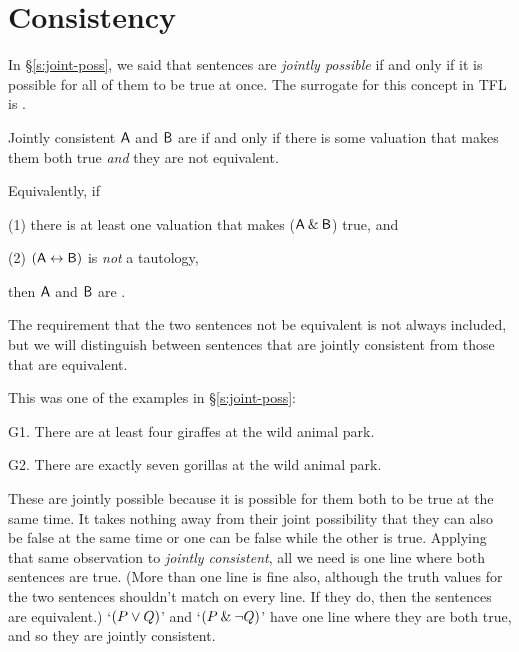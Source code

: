 \section{Consistency}\label{consistency--tt}
In \S\ref{s:joint-poss}, we said that sentences are \textit{jointly possible} if and only if it is possible for all of them to be true at once. The surrogate for this concept in TFL is . 

\begin{factboxy}{Jointly consistent}
$\mathsf{A}$ and $\mathsf{B}$ are  if and only if there is some valuation that makes them both true \textit{and} they are not equivalent.
\medskip
		
Equivalently, if
\begin{earg}
\vspace{-2mm}
	\item[(1)] there is at least one valuation that makes ($\mathsf{A}\mathbin{\&}\mathsf{B}$) true, and
	\item[(2)] $(\mathsf{A} \leftrightarrow \mathsf{B})$ is \textit{not} a tautology,
\vspace{-2mm}
\end{earg}		
then $\mathsf{A}$ and $\mathsf{B}$ are .
\end{factboxy}

\noindent The requirement that the two sentences not be equivalent is not always included, but we will distinguish between sentences that are jointly consistent from those that are equivalent. 

This was one of the examples in \S\ref{s:joint-poss}:
\begin{ebullet}	
		\item[G1.] There are at least four giraffes at the wild animal park.
		\item[G2.] There are exactly seven gorillas at the wild animal park.
	\end{ebullet}
These are jointly possible because it is possible for them both to be true at the same time. It takes nothing away from their joint possibility that they can also be false at the same time or one can be false while the other is true. Applying that same observation to \textit{jointly consistent}, all we need is one line where both sentences are true. (More than one line is fine also, although the truth values for the two sentences shouldn't match on every line. If they do, then the sentences are equivalent.) `$(P \vee Q)$' and `$(P \mathbin{\&} {\neg} Q)$' have one line where they are both true, and so they are jointly consistent. 

